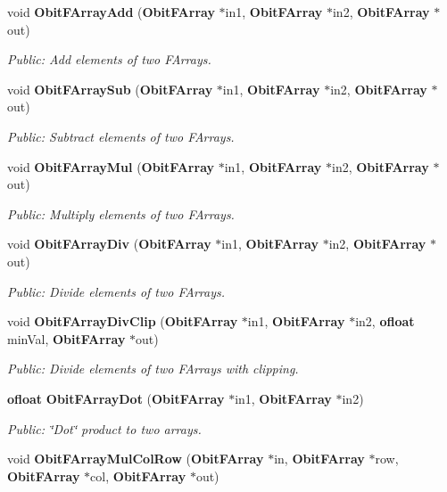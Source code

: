 \begin{CompactItemize}
void {\bf Obit\-FArray\-Add} ({\bf Obit\-FArray} $\ast$in1, {\bf Obit\-FArray} $\ast$in2, {\bf Obit\-FArray} $\ast$out)
\begin{CompactList}\small\item\em Public: Add elements of two FArrays. \item\end{CompactList}\item 
void {\bf Obit\-FArray\-Sub} ({\bf Obit\-FArray} $\ast$in1, {\bf Obit\-FArray} $\ast$in2, {\bf Obit\-FArray} $\ast$out)
\begin{CompactList}\small\item\em Public: Subtract elements of two FArrays. \item\end{CompactList}\item 
void {\bf Obit\-FArray\-Mul} ({\bf Obit\-FArray} $\ast$in1, {\bf Obit\-FArray} $\ast$in2, {\bf Obit\-FArray} $\ast$out)
\begin{CompactList}\small\item\em Public: Multiply elements of two FArrays. \item\end{CompactList}\item 
void {\bf Obit\-FArray\-Div} ({\bf Obit\-FArray} $\ast$in1, {\bf Obit\-FArray} $\ast$in2, {\bf Obit\-FArray} $\ast$out)
\begin{CompactList}\small\item\em Public: Divide elements of two FArrays. \item\end{CompactList}\item 
void {\bf Obit\-FArray\-Div\-Clip} ({\bf Obit\-FArray} $\ast$in1, {\bf Obit\-FArray} $\ast$in2, {\bf ofloat} min\-Val, {\bf Obit\-FArray} $\ast$out)
\begin{CompactList}\small\item\em Public: Divide elements of two FArrays with clipping. \item\end{CompactList}\item 
{\bf ofloat} {\bf Obit\-FArray\-Dot} ({\bf Obit\-FArray} $\ast$in1, {\bf Obit\-FArray} $\ast$in2)
\begin{CompactList}\small\item\em Public: \char`\"{}Dot\char`\"{} product to two arrays. \item\end{CompactList}\item 
void {\bf Obit\-FArray\-Mul\-Col\-Row} ({\bf Obit\-FArray} $\ast$in, {\bf Obit\-FArray} $\ast$row, {\bf Obit\-FArray} $\ast$col, {\bf Obit\-FArray} $\ast$out)

\end{CompactItemize}
